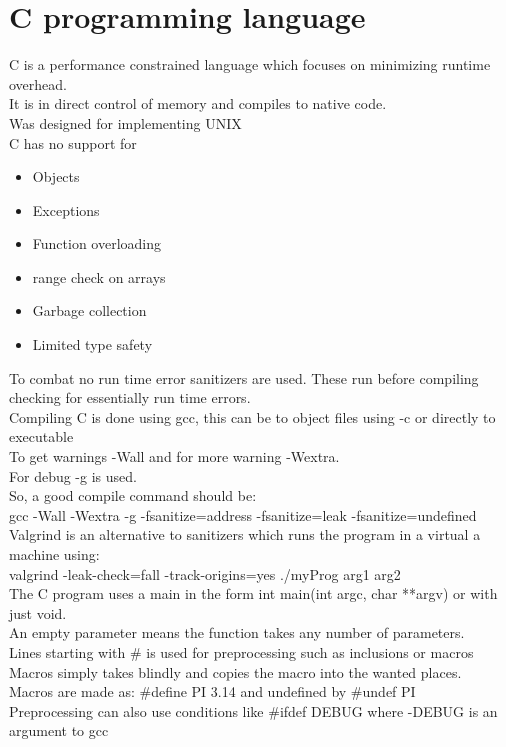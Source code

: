 \documentclass[12pt, a4paper]{article}
\begin{document}
	\section{C programming language}
		C is a performance constrained language which focuses on minimizing runtime overhead.\\
		It is in direct control of memory and compiles to native code.\\
		Was designed for implementing UNIX\\
		C has no support for
		\begin{itemize}
			\item Objects
			\item Exceptions
			\item Function overloading
			\item range check on arrays
			\item Garbage collection
			\item Limited type safety
		\end{itemize}
		To combat no run time error sanitizers are used. These run before compiling checking for essentially run time errors.\\
		Compiling C is done using gcc, this can be to object files using -c or directly to executable\\
		To get warnings -Wall and for more warning -Wextra.\\
		For debug -g is used.\\
		So, a good compile command should be:\\
		gcc -Wall -Wextra -g -fsanitize=address -fsanitize=leak -fsanitize=undefined\\
		Valgrind is an alternative to sanitizers which runs the program in a virtual a machine using:\\
		valgrind -leak-check=fall -track-origins=yes ./myProg arg1 arg2\\
		The C program uses a main in the form int main(int argc, char **argv) or with just void.\\
		An empty parameter means the function takes any number of parameters.\\
		Lines starting with \# is used for preprocessing such as inclusions or macros\\
		Macros simply takes blindly and copies the macro into the wanted places.\\
		Macros are made as: \#define PI 3.14 and undefined by \#undef PI\\
		Preprocessing can also use conditions like \#ifdef DEBUG where -DEBUG is an argument to gcc\\
\end{document}
